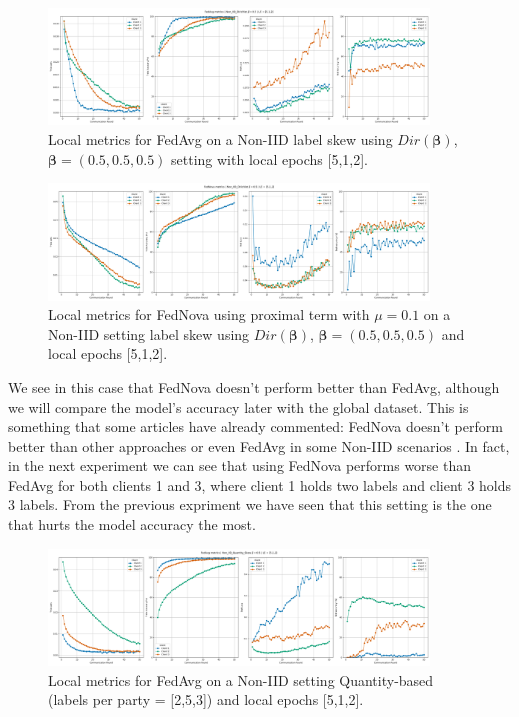 \begin{figure}[H]
  \centering
  \includegraphics[width=0.9\textwidth]{figures/2-Federated_Learning/FedAvg_NonDirichlet_LE_512.png}
  \caption{Local metrics for FedAvg on a Non-IID label skew using $Dir(\boldsymbol{\beta})$, $\boldsymbol{\beta}=(0.5, 0.5, 0.5)$ setting with local epochs [5,1,2].}
  \label{fig:FedAvg_NonDirichlet_LE_512}
\end{figure}


\begin{figure}[H]
  \centering
  \includegraphics[width=0.9\textwidth]{figures/2-Federated_Learning/FedNova_NonDirichlet_LE_512.png}
  \caption{Local metrics for FedNova using proximal term with $\mu=0.1$ on a Non-IID setting label skew using $Dir(\boldsymbol{\beta})$, $\boldsymbol{\beta}=(0.5, 0.5, 0.5)$ and local epochs [5,1,2].}
  \label{fig:FedNova_NonDirichlet_LE_512}
\end{figure}

We see in this case that FedNova doesn't perform better than FedAvg, although we will compare the model's accuracy later with the global dataset. This is something that some articles have already commented: FedNova doesn't perform better than other approaches or even FedAvg in some Non-IID scenarios \cite{li2021}.
In fact, in the next experiment we can see that using FedNova performs worse than FedAvg for both clients 1 and 3, where client 1 holds two labels and client 3 holds 3 labels. From the previous expriment we have seen that this setting is the one that hurts the model accuracy the most.
\begin{figure}[H]
  \centering
  \includegraphics[width=0.9\textwidth]{figures/2-Federated_Learning/FedAvg_QuantityBased_Labels_253_LE_512.png}
  \caption{Local metrics for FedAvg  on a Non-IID setting Quantity-based (labels per party = [2,5,3]) and local epochs [5,1,2].}
  \label{fig:FedAvg_QuantityBased_LabelsPerParty_253_LE_512}
\end{figure}


